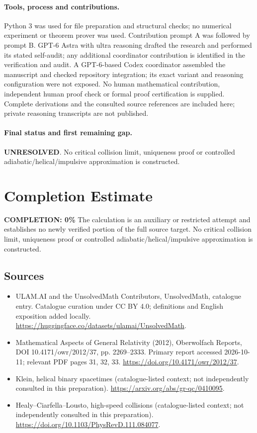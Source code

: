\documentclass[11pt]{article}
\begin{document}
\paragraph{Tools, process and contributions.}
Python 3 was used for file preparation and structural checks; no numerical experiment or theorem prover was used. Contribution prompt A was followed by prompt B. GPT-6 Astra with ultra reasoning drafted the research and performed its stated self-audit; any additional coordinator contribution is identified in the verification and audit. A GPT-6-based Codex coordinator assembled the manuscript and checked repository integration; its exact variant and reasoning configuration were not exposed. No human mathematical contribution, independent human proof check or formal proof certification is supplied. Complete derivations and the consulted source references are included here; private reasoning transcripts are not published.

\paragraph{Final status and first remaining gap.}
\textbf{UNRESOLVED}. No critical collision limit, uniqueness proof or controlled adiabatic/helical/impulsive approximation is constructed.

\section{Completion Estimate}
\noindent\textbf{COMPLETION: 0\%}
The calculation is an auxiliary or restricted attempt and establishes no newly verified portion of the full source target. No critical collision limit, uniqueness proof or controlled adiabatic/helical/impulsive approximation is constructed.

\subsection{Sources}
\begin{itemize}
\item[\hypertarget{source:statement:1}{S1}] ULAM.AI and the UnsolvedMath Contributors, UnsolvedMath, catalogue entry. Catalogue curation under CC BY 4.0; definitions and English exposition added locally.
\url{https://huggingface.co/datasets/ulamai/UnsolvedMath}.
\item[\hypertarget{source:statement:2}{S2}] Mathematical Aspects of General Relativity (2012), Oberwolfach Reports, DOI 10.4171/owr/2012/37, pp. 2269--2333. Primary report accessed 2026-10-11; relevant PDF pages 31, 32, 33.
\url{https://doi.org/10.4171/owr/2012/37}.
\item[\hypertarget{source:statement:3}{S3}] Klein, helical binary spacetimes (catalogue-listed context; not independently consulted in this preparation).
\url{https://arxiv.org/abs/gr-qc/0410095}.
\item[\hypertarget{source:statement:4}{S4}] Healy--Ciarfella--Lousto, high-speed collisions (catalogue-listed context; not independently consulted in this preparation).
\url{https://doi.org/10.1103/PhysRevD.111.084077}.
\end{itemize}
\label{end:statement}
\end{document}
